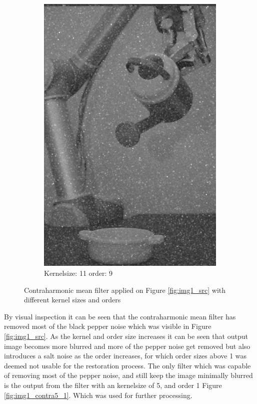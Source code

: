 \begin{figure}[H]
\begin{subfigure}[b]{0.30\textwidth}
        \includegraphics[width=\textwidth]{img1/img_1_gaus_11_9.png}
        \caption{Kernelsize: 11 order: 9}
		 \label{fig:img1_contra11_9}
    \end{subfigure}
    \caption{Contraharmonic mean filter applied on Figure \ref{fig:img1_src} with different kernel sizes and orders}
    \label{fig:img1_contra}
\end{figure}

By visual inspection it can be seen that the contraharmonic mean filter has removed most of the black pepper noise which was visible in Figure \ref{fig:img1_src}. As the kernel and order size increases it can be seen that output image becomes more blurred and more of the pepper noise  get removed but also introduces a salt noise as the order increases, for which order sizes above 1 was deemed not usable for the  restoration process.   The only filter which was capable of removing most of the pepper noise, and still keep the image minimally blurred is the output from the filter with an kernelsize of 5, and order 1 Figure \ref{fig:img1_contra5_1}. Which was used for further processing. \\

